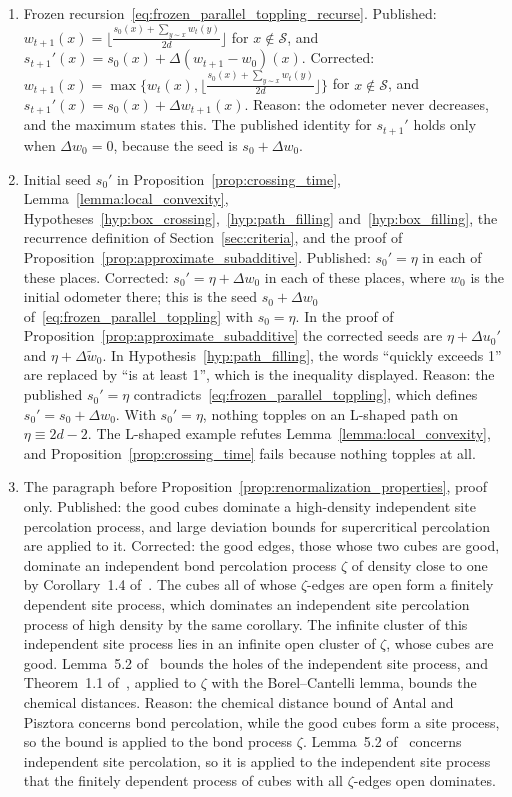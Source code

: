 \documentclass[12pt]{amsart}
\begin{document}
\begin{enumerate}
\item[C04.] Frozen recursion~\eqref{eq:frozen_parallel_toppling_recurse}. Published: $w_{t+1}(x)=\lfloor\frac{s_0(x)+\sum_{y\sim x}w_t(y)}{2d}\rfloor$ for $x\notin\mathcal S$, and $s_{t+1}'(x)=s_0(x)+\Delta(w_{t+1}-w_0)(x)$. Corrected: $w_{t+1}(x)=\max\{w_t(x),\lfloor\frac{s_0(x)+\sum_{y\sim x}w_t(y)}{2d}\rfloor\}$ for $x\notin\mathcal S$, and $s_{t+1}'(x)=s_0(x)+\Delta w_{t+1}(x)$. Reason: the odometer never decreases, and the maximum states this. The published identity for $s_{t+1}'$ holds only when $\Delta w_0=0$, because the seed is $s_0+\Delta w_0$.
\item[C05.] Initial seed $s_0'$ in Proposition~\ref{prop:crossing_time}, Lemma~\ref{lemma:local_convexity}, Hypotheses~\ref{hyp:box_crossing},~\ref{hyp:path_filling} and~\ref{hyp:box_filling}, the recurrence definition of Section~\ref{sec:criteria}, and the proof of Proposition~\ref{prop:approximate_subadditive}. Published: $s_0'=\eta$ in each of these places. Corrected: $s_0'=\eta+\Delta w_0$ in each of these places, where $w_0$ is the initial odometer there; this is the seed $s_0+\Delta w_0$ of~\eqref{eq:frozen_parallel_toppling} with $s_0=\eta$. In the proof of Proposition~\ref{prop:approximate_subadditive} the corrected seeds are $\eta+\Delta u_0'$ and $\eta+\Delta\tilde w_0$. In Hypothesis~\ref{hyp:path_filling}, the words ``quickly exceeds 1'' are replaced by ``is at least 1'', which is the inequality displayed. Reason: the published $s_0'=\eta$ contradicts~\eqref{eq:frozen_parallel_toppling}, which defines $s_0'=s_0+\Delta w_0$. With $s_0'=\eta$, nothing topples on an L-shaped path on $\eta\equiv2d-2$. The L-shaped example refutes Lemma~\ref{lemma:local_convexity}, and Proposition~\ref{prop:crossing_time} fails because nothing topples at all.
\item[C06.] The paragraph before Proposition~\ref{prop:renormalization_properties}, proof only. Published: the good cubes dominate a high-density independent site percolation process, and large deviation bounds for supercritical percolation~\cite{antal1996chemical, garet2007large} are applied to it. Corrected: the good edges, those whose two cubes are good, dominate an independent bond percolation process $\zeta$ of density close to one by Corollary~1.4 of~\cite{liggett1997domination}. The cubes all of whose $\zeta$-edges are open form a finitely dependent site process, which dominates an independent site percolation process of high density by the same corollary. The infinite cluster of this independent site process lies in an infinite open cluster of $\zeta$, whose cubes are good. Lemma~5.2 of~\cite{mathieu2008quenched} bounds the holes of the independent site process, and Theorem~1.1 of~\cite{antal1996chemical}, applied to $\zeta$ with the Borel--Cantelli lemma, bounds the chemical distances. Reason: the chemical distance bound of Antal and Pisztora concerns bond percolation, while the good cubes form a site process, so the bound is applied to the bond process $\zeta$. Lemma~5.2 of~\cite{mathieu2008quenched} concerns independent site percolation, so it is applied to the independent site process that the finitely dependent process of cubes with all $\zeta$-edges open dominates.

\end{enumerate}
\end{document}

